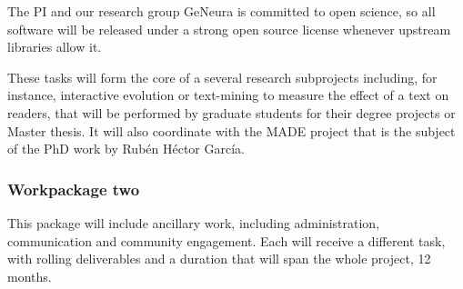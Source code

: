 \documentclass[a4paper,12pt,twocolumn]{article}
\begin{document}
The PI and our research group GeNeura is committed to open science, so
all software will be released under a strong open source license
whenever upstream libraries allow it.

These tasks will form the core of a several research subprojects
including, for instance, interactive evolution or text-mining to
measure the effect of a text on readers, that will be performed by
graduate students for their degree projects or Master thesis. It will
also coordinate with the MADE project that is the subject of the PhD
work by Rub\'en H\'ector Garc\'ia. 

\subsubsection{Workpackage two}

This package will include ancillary work, including administration,
communication and community engagement. Each will receive a different
task, with rolling deliverables and a duration that will span the
whole project, 12 months.
\end{document}

